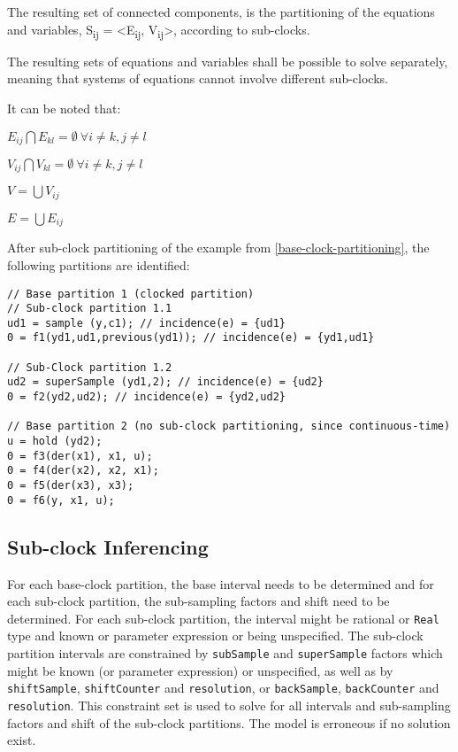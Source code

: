 The resulting set of connected components, is the partitioning of the
equations and variables, S\textsubscript{ij} =
\textless{}E\textsubscript{ij}, V\textsubscript{ij}\textgreater{},
according to sub-clocks.

The resulting sets of equations and variables shall be possible to solve separately,
meaning that systems of equations cannot involve different sub-clocks.

It can be noted that:

$E_{ij} \bigcap E_{kl} = \emptyset~ \forall i\ne{}k, j\ne{}l$

$ V_{ij} \bigcap V_{kl} = \emptyset~ \forall i\ne{}k, j\ne{}l$

$V = \bigcup V_{ij}$

$E = \bigcup E_{ij}$

\begin{example}
After sub-clock partitioning of the example from \cref{base-clock-partitioning}, the following partitions are identified:
\begin{lstlisting}[language=modelica]
// Base partition 1 (clocked partition)
// Sub-clock partition 1.1
ud1 = sample (y,c1); // incidence(e) = {ud1}
0 = f1(yd1,ud1,previous(yd1)); // incidence(e) = {yd1,ud1}

// Sub-Clock partition 1.2
ud2 = superSample (yd1,2); // incidence(e) = {ud2}
0 = f2(yd2,ud2); // incidence(e) = {yd2,ud2}

// Base partition 2 (no sub-clock partitioning, since continuous-time)
u = hold (yd2);
0 = f3(der(x1), x1, u);
0 = f4(der(x2), x2, x1);
0 = f5(der(x3), x3);
0 = f6(y, x1, u);
\end{lstlisting}
\end{example}

\subsection{Sub-clock Inferencing}\label{sub-clock-inferencing}

For each base-clock partition, the base interval needs to be determined and for each sub-clock partition, the sub-sampling factors and shift need to be determined.
For each sub-clock partition, the interval might be rational or \lstinline!Real! type and known or parameter expression or being unspecified. %
The sub-clock partition intervals are constrained by \lstinline!subSample! and \lstinline!superSample! factors which might be known (or parameter expression) or unspecified, as well as by \lstinline!shiftSample!, \lstinline!shiftCounter! and \lstinline!resolution!, or \lstinline!backSample!, \lstinline!backCounter! and \lstinline!resolution!.
This constraint set is used to solve for all intervals and sub-sampling factors and shift of the sub-clock partitions.
The model is erroneous if no solution exist.

